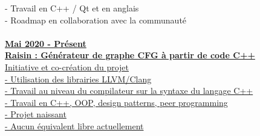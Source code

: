 \documentclass[a4paper]{article}
\begin{document}
{\begin{minipage}[t]{0.6\paperwidth}
{\begin{minipage}[H]{0.58\paperwidth}
{		\hspace{2cm} - Travail en C++ / Qt et en anglais\\
		\hspace{2cm} - Roadmap en collaboration avec la communauté\\
		}
		\ \\
%
		\href{https://github.com/Dauliac/raisin}{
		\textbf{Mai 2020 - Présent}\\
		\hspace{1cm} \textbf{Raisin : Générateur de graphe CFG à partir de code C++}\\
		\hspace{1cm} Initiative et co-création du projet\\
		\hspace{2cm} - Utilisation des librairies LLVM/Clang\\
		\hspace{2cm} - Travail au niveau du compilateur sur la syntaxe du langage C++\\
		\hspace{2cm} - Travail en C++, OOP, design patterns, peer programming\\
		\hspace{2cm} - Projet naissant\\
		\hspace{2cm} - Aucun équivalent libre actuellement\\
		}
		\end{minipage}\if{}} \fi


\end{minipage}}
\end{document}
